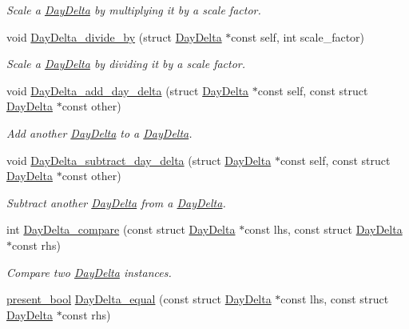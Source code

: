 \begin{DoxyCompactItemize}
\begin{DoxyCompactList}\small\item\em \-Scale a \hyperlink{structDayDelta}{\-Day\-Delta} by multiplying it by a scale factor. \end{DoxyCompactList}\item 
void \hyperlink{day-delta_8h_a03f5153b765a355870053d9cf1ce5c78}{\-Day\-Delta\-\_\-divide\-\_\-by} (struct \hyperlink{structDayDelta}{\-Day\-Delta} $\ast$const self, int scale\-\_\-factor)
\begin{DoxyCompactList}\small\item\em \-Scale a \hyperlink{structDayDelta}{\-Day\-Delta} by dividing it by a scale factor. \end{DoxyCompactList}\item 
void \hyperlink{day-delta_8h_aeb9c43b6e4ea6121ede2cdba92131176}{\-Day\-Delta\-\_\-add\-\_\-day\-\_\-delta} (struct \hyperlink{structDayDelta}{\-Day\-Delta} $\ast$const self, const struct \hyperlink{structDayDelta}{\-Day\-Delta} $\ast$const other)
\begin{DoxyCompactList}\small\item\em \-Add another \hyperlink{structDayDelta}{\-Day\-Delta} to a \hyperlink{structDayDelta}{\-Day\-Delta}. \end{DoxyCompactList}\item 
void \hyperlink{day-delta_8h_aac914e0e1099253836fdeeae0015a2a7}{\-Day\-Delta\-\_\-subtract\-\_\-day\-\_\-delta} (struct \hyperlink{structDayDelta}{\-Day\-Delta} $\ast$const self, const struct \hyperlink{structDayDelta}{\-Day\-Delta} $\ast$const other)
\begin{DoxyCompactList}\small\item\em \-Subtract another \hyperlink{structDayDelta}{\-Day\-Delta} from a \hyperlink{structDayDelta}{\-Day\-Delta}. \end{DoxyCompactList}\item 
int \hyperlink{day-delta_8h_a9c2839c462e80f6419bb9e55f1744eab}{\-Day\-Delta\-\_\-compare} (const struct \hyperlink{structDayDelta}{\-Day\-Delta} $\ast$const lhs, const struct \hyperlink{structDayDelta}{\-Day\-Delta} $\ast$const rhs)
\begin{DoxyCompactList}\small\item\em \-Compare two \hyperlink{structDayDelta}{\-Day\-Delta} instances. \end{DoxyCompactList}\item 
\hyperlink{types_8h_a1c24e2cdd988b886e889080ded176ae0}{present\-\_\-bool} \hyperlink{day-delta_8h_aec7bbfd9ee83f64b94117028c4d856f5}{\-Day\-Delta\-\_\-equal} (const struct \hyperlink{structDayDelta}{\-Day\-Delta} $\ast$const lhs, const struct \hyperlink{structDayDelta}{\-Day\-Delta} $\ast$const rhs)

\end{DoxyCompactItemize}

